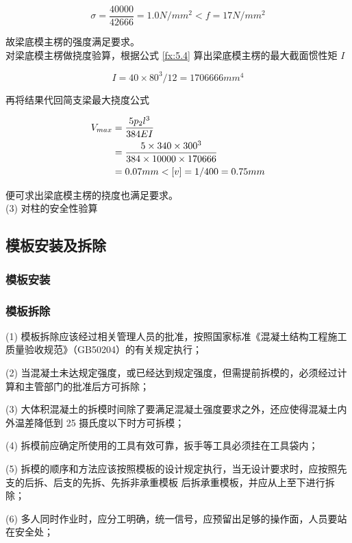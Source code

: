 \[
    \sigma = \frac{40000}{42666}=1.0 N/mm^2< f=17N/mm^2
\]

故梁底模主楞的强度满足要求。\\

对梁底模主楞做挠度验算，根据公式 \ref{fx:5.4} 算出梁底模主楞的最大截面惯性矩 $I$

\[
    I=40\times 80^3 /12=1706666 mm^4
\]

再将结果代回简支梁最大挠度公式 

\begin{align}
    V_{max}&=\frac{5p_2l^3}{384EI}\\
    &=\frac{5\times 340\times 300^3}{384\times 10000\times 170666} \notag \\
    &=0.07mm<[v]=1/400=0.75mm \notag
\end{align}

便可求出梁底模主楞的挠度也满足要求。\\

(3) 对柱的安全性验算\\



\subsection{模板安装及拆除}
\subsubsection{模板安装}

\subsubsection{模板拆除}

(1) 模板拆除应该经过相关管理人员的批准，按照国家标准《混凝土结构工程施工质量验收规范》（GB50204）的有关规定执行；

(2) 当混凝土未达规定强度，或已经达到规定强度，但需提前拆模的，必须经过计算和主管部门的批准后方可拆除；

(3) 大体积混凝土的拆模时间除了要满足混凝土强度要求之外，还应使得混凝土内外温差降低到 25 摄氏度以下时方可拆模；

(4) 拆模前应确定所使用的工具有效可靠，扳手等工具必须挂在工具袋内；

(5) 拆模的顺序和方法应该按照模板的设计规定执行，当无设计要求时，应按照先支的后拆、后支的先拆、先拆非承重模板
后拆承重模板，并应从上至下进行拆除；

(6) 多人同时作业时，应分工明确，统一信号，应预留出足够的操作面，人员要站在安全处；

